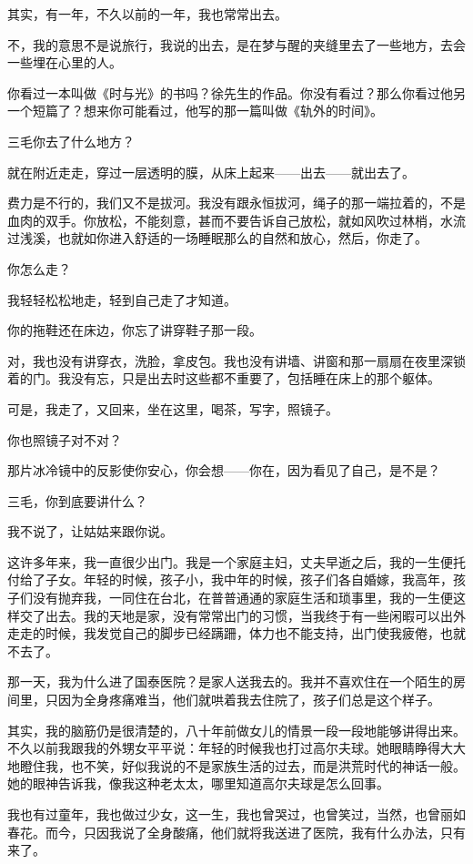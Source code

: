 \par 其实，有一年，不久以前的一年，我也常常出去。
\par 不，我的意思不是说旅行，我说的出去，是在梦与醒的夹缝里去了一些地方，去会一些埋在心里的人。
\par 你看过一本叫做《时与光》的书吗？徐先生的作品。你没有看过？那么你看过他另一个短篇了？想来你可能看过，他写的那一篇叫做《轨外的时间》。
\par 三毛你去了什么地方？
\par 就在附近走走，穿过一层透明的膜，从床上起来——出去——就出去了。
\par 费力是不行的，我们又不是拔河。我没有跟永恒拔河，绳子的那一端拉着的，不是血肉的双手。你放松，不能刻意，甚而不要告诉自己放松，就如风吹过林梢，水流过浅溪，也就如你进入舒适的一场睡眠那么的自然和放心，然后，你走了。
\par 你怎么走？
\par 我轻轻松松地走，轻到自己走了才知道。
\par 你的拖鞋还在床边，你忘了讲穿鞋子那一段。
\par 对，我也没有讲穿衣，洗脸，拿皮包。我也没有讲墙、讲窗和那一扇扇在夜里深锁着的门。我没有忘，只是出去时这些都不重要了，包括睡在床上的那个躯体。
\par 可是，我走了，又回来，坐在这里，喝茶，写字，照镜子。
\par 你也照镜子对不对？
\par 那片冰冷镜中的反影使你安心，你会想——你在，因为看见了自己，是不是？
\par 三毛，你到底要讲什么？
\par 我不说了，让姑姑来跟你说。
\par 这许多年来，我一直很少出门。我是一个家庭主妇，丈夫早逝之后，我的一生便托付给了子女。年轻的时候，孩子小，我中年的时候，孩子们各自婚嫁，我高年，孩子们没有抛弃我，一同住在台北，在普普通通的家庭生活和琐事里，我的一生便这样交了出去。我的天地是家，没有常常出门的习惯，当我终于有一些闲暇可以出外走走的时候，我发觉自己的脚步已经蹒跚，体力也不能支持，出门使我疲倦，也就不去了。
\par 那一天，我为什么进了国泰医院？是家人送我去的。我并不喜欢住在一个陌生的房间里，只因为全身疼痛难当，他们就哄着我去住院了，孩子们总是这个样子。
\par 其实，我的脑筋仍是很清楚的，八十年前做女儿的情景一段一段地能够讲得出来。不久以前我跟我的外甥女平平说：年轻的时候我也打过高尔夫球。她眼睛睁得大大地瞪住我，也不笑，好似我说的不是家族生活的过去，而是洪荒时代的神话一般。她的眼神告诉我，像我这种老太太，哪里知道高尔夫球是怎么回事。
\par 我也有过童年，我也做过少女，这一生，我也曾哭过，也曾笑过，当然，也曾丽如春花。而今，只因我说了全身酸痛，他们就将我送进了医院，我有什么办法，只有来了。

